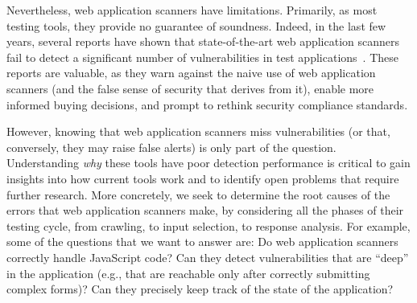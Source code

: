 
Nevertheless, web application scanners have limitations. 
Primarily, as most testing tools, they provide no guarantee of
soundness.
Indeed, in the last few years, several reports have shown that
state-of-the-art web application scanners fail to detect a significant
number of vulnerabilities in test applications~\cite{suto07,suto10:webscanners,wiegenstein06,peine06,anantasec09}.
These reports are valuable, as they warn against the naive use of web
application scanners (and the false sense of security that derives from
it), enable more informed buying decisions, and  prompt to rethink
security compliance standards. 

However, knowing that web application scanners miss vulnerabilities (or
that, conversely, they may raise false alerts) is only part of the
question. Understanding {\em why} these tools have poor detection
performance is critical to gain insights into how current tools work and
to identify open problems that require further research.  
%
More concretely, we seek to determine the root causes of the
errors that web application scanners make, by considering all the phases
of their testing cycle, from crawling, to input selection, to response
analysis.
%
For example, some of the questions that we want to
answer are: Do web application scanners correctly handle JavaScript
code? Can they detect vulnerabilities that are ``deep'' in the
application (e.g., that are reachable only after correctly submitting
complex forms)? Can they precisely keep track of the state of the
application?

